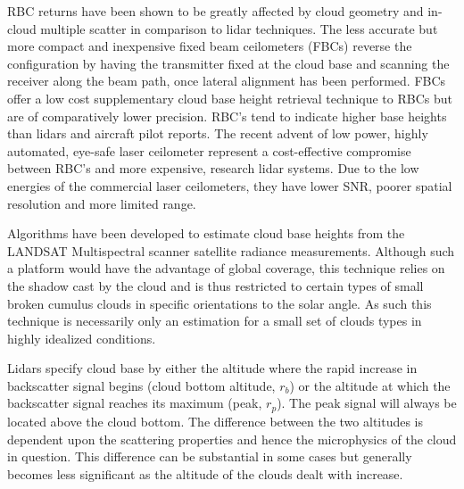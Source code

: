 RBC returns have been shown
to be greatly affected by cloud geometry and in-cloud multiple scatter
in comparison to lidar techniques. The less accurate but more compact 
and inexpensive fixed beam ceilometers (FBCs) reverse the
configuration by having the transmitter fixed at the cloud base and
scanning the receiver along the beam path, once lateral alignment
has been performed. FBCs offer a low cost supplementary cloud base
height retrieval technique to RBCs but are of comparatively lower 
precision. RBC's tend to indicate higher
base heights than lidars and aircraft pilot 
reports. The recent advent of low power, 
highly automated, eye-safe laser ceilometer
represent a cost-effective compromise between RBC's
and more expensive, 
research lidar systems. Due to the
low energies of the commercial laser ceilometers,
they have lower SNR,
poorer spatial resolution
and more limited range. 

Algorithms have been developed to estimate cloud base
heights from the LANDSAT Multispectral scanner
satellite radiance measurements.
Although such a platform would have the
advantage of global coverage, this technique 
relies on the shadow cast by the cloud 
and is thus restricted to certain 
types of small broken cumulus clouds
in specific orientations to the solar angle.
As such this technique is necessarily only
an estimation for a small set of clouds
types in highly idealized conditions.
\cite{tbsksrmwbawmn}
 

Lidars specify cloud base by either the altitude where
the rapid increase in backscatter signal begins 
(cloud bottom altitude, $r_{b}$) or the 
altitude at which the backscatter 
signal reaches its maximum (peak, $r_{p}$).
The peak signal will always be located above the
cloud bottom. The difference between the two altitudes
is dependent upon the scattering properties and hence the
microphysics of the cloud in question. This difference can
be substantial in some cases but generally
becomes less significant as the altitude of the clouds dealt with increase. 

